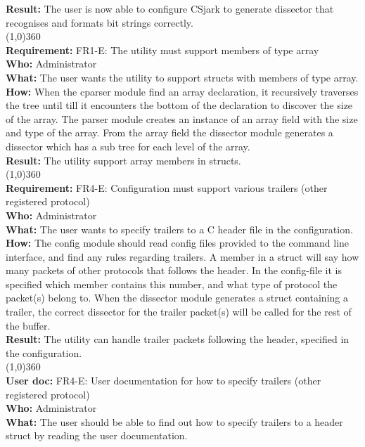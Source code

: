 \textbf{Result:} The user is now able to configure CSjark to generate dissector that recognises and formats bit strings correctly.\\
\line(1,0){360}\\
\textbf{Requirement:} FR1-E: The utility must support members of type array\\
\textbf{Who:} Administrator\\
\textbf{What:} The user wants the utility to support structs with members of type array.\\
\textbf{How:} When the cparser module find an array declaration, it recursively traverses the tree until till it encounters the bottom of the declaration to discover the size of the array. The parser module creates an instance of an array field with the size and type of the array. From the array field the dissector module generates a dissector which has a sub tree for each level of the array.\\
\textbf{Result:} The utility support array members in structs.\\
\line(1,0){360}\\
\textbf{Requirement:} FR4-E: Configuration must support various trailers (other registered protocol)\\
\textbf{Who:} Administrator\\ 
\textbf{What:} The user wants to specify trailers to a C header file in the configuration.\\
\textbf{How:} The config module should read config files provided to the command line interface, and find any rules regarding trailers. A member in a struct will say how many packets of other protocols that follows the header. In the config-file it is specified which member contains this number, and what type of protocol the packet(s) belong to. When the dissector module generates a struct containing a trailer, the correct dissector for the trailer packet(s) will be called for the rest of the buffer.\\
\textbf{Result:} The utility can handle trailer packets following the header, specified in the configuration.\\
\line(1,0){360}\\
\textbf{User doc:} FR4-E: User documentation for how to specify trailers (other registered protocol)\\
\textbf{Who:} Administrator\\
\textbf{What:} The user should be able to find out how to specify trailers to a header struct by reading the user documentation.\\
